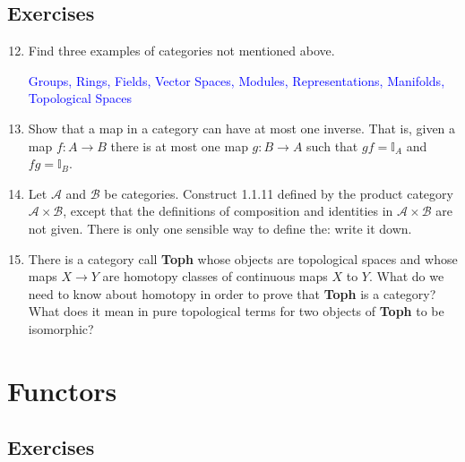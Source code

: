 \documentclass[12pt,a4paper]{report}
\newcommand{\BLUE}[1]{\textcolor{blue}{#1}}
\newcommand{\II}{\mathbb{I}}
\newcommand{\CAT}[1]{\mathscr{#1}}
\begin{document}
\HLINE


\subsection{Exercises}

\begin{enumerate}[label=1.1.\arabic*]
\setcounter{enumi}{11}
\item Find three examples of categories not mentioned above.

\BLUE{Groups, Rings, Fields, Vector Spaces, Modules, Representations, Manifolds, Topological Spaces
}

\item Show that a map in a category can have at most one inverse.  That is, given a map $f: A \to B$ there is at most one map $g: B \to A$ such that $gf=\II_A$ and $fg=\II_B$.

\item Let $\CAT{A}$ and $\CAT{B}$ be categories.  Construct 1.1.11 defined by the product category $\CAT{A}\times\CAT{B}$, except that the definitions of composition and identities in $\CAT{A}\times\CAT{B}$ are not given.  There is only one sensible way to define the: write it down.

\item There is a category call \textbf{Toph} whose objects are topological spaces and whose maps $X\to Y$ are homotopy classes of continuous maps $X$ to $Y$.  What do we need to know about homotopy in order to prove that \textbf{Toph} is a category?  What does it mean in pure topological terms for two objects of \textbf{Toph} to be isomorphic?

\end{enumerate}

\section{Functors}

\subsection{Exercises}
\end{document}
